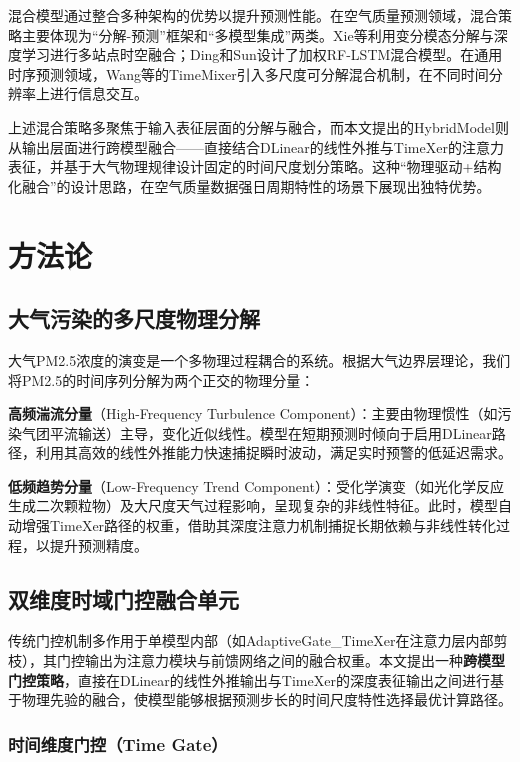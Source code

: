 \documentclass[12pt,a4paper]{article}
\begin{document}
混合模型通过整合多种架构的优势以提升预测性能。在空气质量预测领域，混合策略主要体现为``分解-预测''框架和``多模型集成''两类。Xie等\cite{xie2024daily}利用变分模态分解与深度学习进行多站点时空融合；Ding和Sun\cite{ding2023prediction}设计了加权RF-LSTM混合模型。在通用时序预测领域，Wang等\cite{wang2024timemixer}的TimeMixer引入多尺度可分解混合机制，在不同时间分辨率上进行信息交互。

上述混合策略多聚焦于输入表征层面的分解与融合，而本文提出的HybridModel则从输出层面进行跨模型融合——直接结合DLinear的线性外推与TimeXer的注意力表征，并基于大气物理规律设计固定的时间尺度划分策略。这种``物理驱动+结构化融合''的设计思路，在空气质量数据强日周期特性的场景下展现出独特优势。
\section{方法论}

\subsection{大气污染的多尺度物理分解}

大气PM2.5浓度的演变是一个多物理过程耦合的系统。根据大气边界层理论\cite{stull1988introduction}，我们将PM2.5的时间序列分解为两个正交的物理分量：

\textbf{高频湍流分量}（High-Frequency Turbulence Component）：主要由物理惯性（如污染气团平流输送）主导，变化近似线性。模型在短期预测时倾向于启用DLinear路径，利用其高效的线性外推能力快速捕捉瞬时波动，满足实时预警的低延迟需求。

\textbf{低频趋势分量}（Low-Frequency Trend Component）：受化学演变（如光化学反应生成二次颗粒物\cite{huang2014high}）及大尺度天气过程影响，呈现复杂的非线性特征。此时，模型自动增强TimeXer路径的权重，借助其深度注意力机制捕捉长期依赖与非线性转化过程，以提升预测精度。

\subsection{双维度时域门控融合单元}

传统门控机制多作用于单模型内部（如AdaptiveGate\_TimeXer在注意力层内部剪枝），其门控输出为注意力模块与前馈网络之间的融合权重。本文提出一种\textbf{跨模型门控策略}，直接在DLinear的线性外推输出与TimeXer的深度表征输出之间进行基于物理先验的融合，使模型能够根据预测步长的时间尺度特性选择最优计算路径。

\subsubsection{时间维度门控（Time Gate）}
\end{document}
